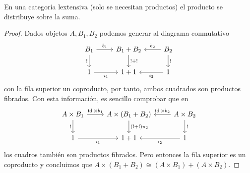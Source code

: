 \begin{proposition}[label=prop:lextdistributiva]
  En una categoría lextensiva (solo se necesitan productos) el producto se
  distribuye sobre la suma.
\end{proposition}
\begin{proof}
  Dados objetos $A,B_1,B_2$ podemos generar al diagrama conmutativo
  \begin{equation*}
    \begin{tikzcd}
      B_1\ar{r}{b_1}\ar[swap]{d}{!} & B_1+B_2\ar{d}{!+!} & B_2\ar[swap]{l}{b_2}\ar{d}{!} \\
      1\ar[swap]{r}{i_1} & 1+1 & 1\ar{l}{i_2}
    \end{tikzcd}
  \end{equation*}
  con la fila superior un coproducto, por tanto, ambos cuadrados son productos fibrados.
  Con esta información, es sencillo comprobar que en
  \begin{equation*}
    \begin{tikzcd}
      A\times B_1\ar{r}{\id\times b_1}\ar[swap]{d}{!} & A\times(B_1+B_2)\ar{d}{(!+!)\pi_2} & A\times B_2\ar[swap]{l}{\id\times b_2}\ar{d}{!} \\
      1\ar[swap]{r}{i_1} & 1+1 & 1\ar{l}{i_2}
    \end{tikzcd}
  \end{equation*}
  los cuadros también son productos fibrados. Pero entonces la fila superior es
  un coproducto y concluimos que $A\times(B_1+B_2)\cong(A\times B_1)+(A\times B_2)$.
\end{proof}


